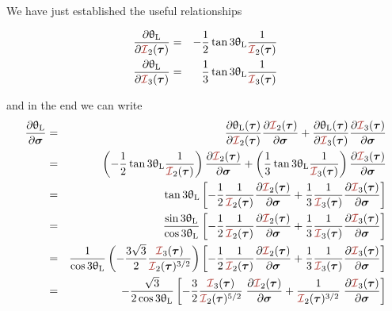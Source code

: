 We have just established the useful relationships
\begin{mdframed}[backgroundcolor=blue!5]
\begin{eqnarray}
\frac{\partial \uptheta_{\rm L}}{\partial {\III}_2(\bm\tau)}
&=& -\frac12 \tan 3\uptheta_{\rm L} \frac{1}{ {\III}_2(\bm\tau)}  \label{eq:dthetadI2} \\
\frac{\partial \uptheta_{\rm L}}{\partial {\III}_3(\bm\tau)}
&=& \frac13 \tan 3\uptheta_{\rm L} \frac{1}{{\III}_3(\bm\tau)}   \label{eq:dthetadI3}
\end{eqnarray}
\end{mdframed}
and in the end we can write
\begin{eqnarray}
\frac{\partial \uptheta_{\rm L}}{\partial \bm\sigma}
&=&
\frac{\partial \uptheta_{\rm L}(\bm\tau)}{\partial {\III}_2(\bm\tau)}
\frac{\partial {\III}_2(\bm\tau)}{\partial \bm\sigma}
+
\frac{\partial \uptheta_{\rm L}(\bm\tau)}{\partial {\III}_3(\bm\tau)}
\frac{\partial {\III}_3(\bm\tau)}{\partial \bm\sigma} \nn\\
&=&
\left(-\frac12 \tan 3\uptheta_{\rm L} \frac{1}{ {\III}_2(\bm\tau)}  \right)
\frac{\partial {\III}_2(\bm\tau)}{\partial \bm\sigma} 
+ 
\left(\frac13 \tan 3\uptheta_{\rm L} \frac{1}{{\III}_3(\bm\tau)} \right)
 \frac{\partial  {\III}_3(\bm\tau)}{\partial \bm\sigma} \nn\\
&=&
\tan 3\uptheta_{\rm L}
\left[
-\frac12  \frac{1}{ {\III}_2(\bm\tau)}
 \frac{\partial {\III}_2(\bm\tau)}{\partial \bm\sigma} 
+ \frac13 \frac{1}{{\III}_3(\bm\tau)} 
 \frac{\partial {\III}_3(\bm\tau)}{\partial \bm\sigma} 
\right]
\nn\\
&=&
\frac{\sin 3\uptheta_{\rm L}}{\cos 3\uptheta_{\rm L}}
\left[
-\frac12  \frac{1}{ {\III}_2(\bm\tau)}
 \frac{\partial {\III}_2(\bm\tau)}{\partial \bm\sigma} 
+ \frac13 \frac{1}{{\III}_3(\bm\tau)} 
 \frac{\partial {\III}_3(\bm\tau)}{\partial \bm\sigma} 
\right]
\nn\\
&=&
\frac{1}{\cos 3\uptheta_{\rm L}}
\left(-\frac{3\sqrt{3}}{2}  \frac{{\III}_3(\bm\tau)}{{\III}_2(\bm\tau)^{3/2}} \right)
\left[
-\frac12  \frac{1}{ {\III}_2(\bm\tau)}
 \frac{\partial {\III}_2(\bm\tau)}{\partial \bm\sigma} 
+ \frac13 \frac{1}{{\III}_3(\bm\tau)} 
 \frac{\partial {\III}_3(\bm\tau)}{\partial \bm\sigma} 
\right]
\nn\\
&=&
-\frac{\sqrt{3}}{2\cos 3\uptheta_{\rm L}}
\left[
-\frac32  \frac{ {\III}_3(\bm\tau)   }{ {\III}_2(\bm\tau)^{5/2}}
\; \frac{\partial {\III}_2(\bm\tau)}{\partial \bm\sigma} 
+  \frac{1}{{\III}_2(\bm\tau)^{3/2}} 
\; \frac{\partial {\III}_3(\bm\tau)}{\partial \bm\sigma} 
\right]
\end{eqnarray}
